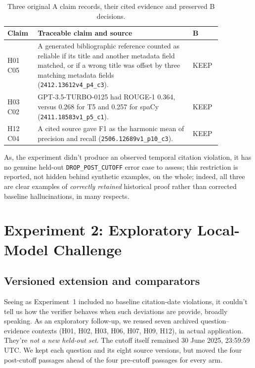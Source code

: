 \documentclass[12pt,a4paper]{article}
\begin{document}
\begin{table}[ht]
\centering\small
\caption{Three original A claim records, their cited evidence and preserved B decisions.}
\label{tab:examples}
\begin{tabular}{p{0.11\linewidth}p{0.65\linewidth}p{0.10\linewidth}}
\toprule
Claim & Traceable claim and source & B \\
\midrule
H01 C05 & A generated bibliographic reference counted as reliable if its title and another metadata field matched, or if a wrong title was offset by three matching metadata fields (\texttt{2412.13612v4\_p4\_c3}). & KEEP \\
H03 C02 & GPT-3.5-TURBO-0125 had ROUGE-1 0.364, versus 0.268 for T5 and 0.257 for spaCy (\texttt{2411.18583v1\_p5\_c1}). & KEEP \\
H12 C04 & A cited source gave F1 as the harmonic mean of precision and recall (\texttt{2506.12689v1\_p10\_c3}). & KEEP \\
\bottomrule
\end{tabular}
\end{table}

As, the experiment didn't produce an observed temporal citation violation, it has no genuine held-out \texttt{DROP\_POST\_CUTOFF} error case to assess; this restriction is reported, not hidden behind synthetic examples, on the whole; indeed, all three are clear examples of \emph{correctly retained} historical proof rather than corrected baseline hallucinations, in many respects.


\section{Experiment 2: Exploratory Local-Model Challenge}
\label{sec:e2}
\subsection{Versioned extension and comparators}
Seeing as Experiment~1 included no baseline citation-date violations, it couldn't tell us how the verifier behaves when such deviations are provide, broadly speaking. As an exploratory follow-up, we reused seven archived question--evidence contexts (H01, H02, H03, H06, H07, H09, H12), in actual application. They're \emph{not a new held-out set}. The cutoff itself remained 30 June 2025, 23:59:59 UTC. We kept each question and its eight source versions, but moved the four post-cutoff passages ahead of the four pre-cutoff passages for every arm.
\end{document}
